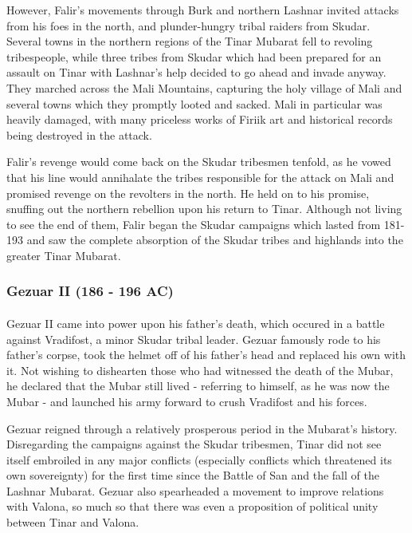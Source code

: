 However, Falir's movements through Burk and northern Lashnar invited attacks from his foes in the north, and plunder-hungry tribal raiders from Skudar. Several towns in the northern regions of the Tinar Mubarat fell to revoling tribespeople, while three tribes from Skudar which had been prepared for an assault on Tinar with Lashnar's help decided to go ahead and invade anyway. They marched across the Mali Mountains, capturing the holy village of Mali and several towns which they promptly looted and sacked. Mali in particular was heavily damaged, with many priceless works of Firiik art and historical records being destroyed in the attack.

Falir's revenge would come back on the Skudar tribesmen tenfold, as he vowed that his line would annihalate the tribes responsible for the attack on Mali and promised revenge on the revolters in the north. He held on to his promise, snuffing out the northern rebellion upon his return to Tinar. Although not living to see the end of them, Falir began the Skudar campaigns which lasted from 181-193 and saw the complete absorption of the Skudar tribes and highlands into the greater Tinar Mubarat.
\subsubsection{Gezuar II (186 - 196 AC)}
\paragraph{}
Gezuar II came into power upon his father's death, which occured in a battle against Vradifost, a minor Skudar tribal leader. Gezuar famously rode to his father's corpse, took the helmet off of his father's head and replaced his own with it. Not wishing to dishearten those who had witnessed the death of the Mubar, he declared that the Mubar still lived - referring to himself, as he was now the Mubar - and launched his army forward to crush Vradifost and his forces.

Gezuar reigned through a relatively prosperous period in the Mubarat's history. Disregarding the campaigns against the Skudar tribesmen, Tinar did not see itself embroiled in any major conflicts (especially conflicts which threatened its own sovereignty) for the first time since the Battle of San and the fall of the Lashnar Mubarat. Gezuar also spearheaded a movement to improve relations with Valona, so much so that there was even a proposition of political unity between Tinar and Valona.

